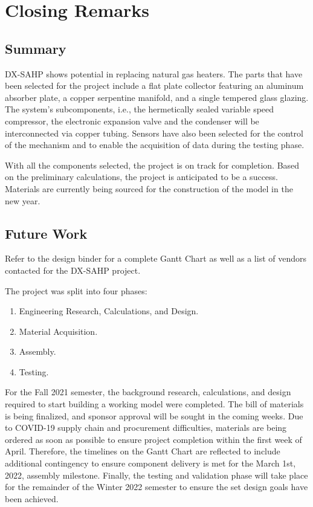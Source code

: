 \chapter{Closing Remarks}

\section{Summary}

DX-SAHP shows potential in replacing natural gas heaters. The parts that have been selected for the project include a flat plate collector featuring an aluminum absorber plate, a copper serpentine manifold, and a single tempered glass glazing. The system’s subcomponents, i.e., the hermetically sealed variable speed compressor, the electronic expansion valve and the condenser will be interconnected via copper tubing. Sensors have also been selected for the control of the mechanism and to enable the acquisition of data during the testing phase.

\medskip
With all the components selected, the project is on track for completion. Based on the preliminary calculations, the project is anticipated to be a success. Materials are currently being sourced for the construction of the model in the new year.

\section{Future Work}

Refer to the design binder for a complete Gantt Chart as well as a list of vendors contacted for the DX-SAHP project.

\medskip
The project was split into four phases:

\medskip
\begin{enumerate}[itemsep=3mm, parsep=-1mm, label=\roman*.]
    \item Engineering Research, Calculations, and Design.
    \item Material Acquisition.
    \item Assembly.
    \item Testing.
\end{enumerate}

\medskip
For the Fall 2021 semester, the background research, calculations, and design required to start building a working model were completed. The bill of materials is being finalized, and sponsor approval will be sought in the coming weeks. Due to COVID-19 supply chain and procurement difficulties, materials are being ordered as soon as possible to ensure project completion within the first week of April. Therefore, the timelines on the Gantt Chart are reflected to include additional contingency to ensure component delivery is met for the March 1st, 2022, assembly milestone. Finally, the testing and validation phase will take place for the remainder of the Winter 2022 semester to ensure the set design goals have been achieved.